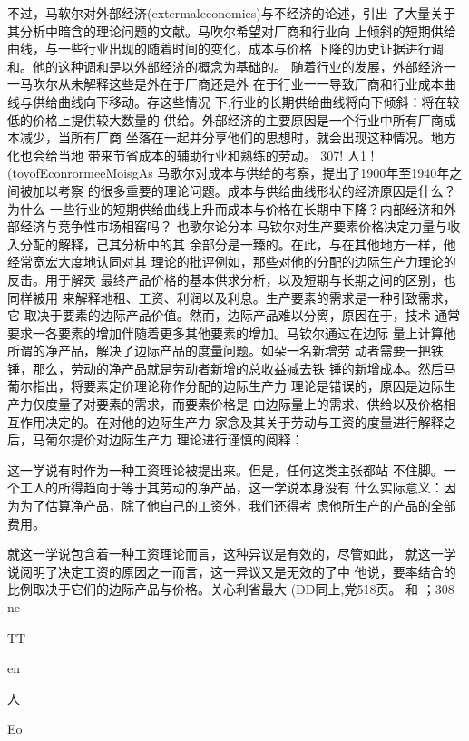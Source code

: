 不过，马软尔对外部经济(extermaleconomies)与不经济的论述，引出
了大量关于其分析中暗含的理论问题的文献。马吹尔希望对厂商和行业向
上倾斜的短期供给曲线，与一些行业出现的随着时间的变化，成本与价格
下降的历史证据进行调和。他的这种调和是以外部经济的概念为基础的。
随着行业的发展，外部经济一一马吹尔从未解释这些是外在于厂商还是外
在于行业一一导致厂商和行业成本曲线与供给曲线向下移动。存这些情况
下,行业的长期供给曲线将向下倾斜：将在较低的价格上提供较大数量的
供给。外部经济的主要原因是一个行业中所有厂商成本减少，当所有厂商
坐落在一起并分享他们的思想时，就会出现这种情况。地方化也会给当地
带来节省成本的辅助行业和熟练的劳动。
307!
人1
!(toyofEconrormeeMoisgAs
马歌尔对成本与供给的考察，提出了1900年至1940年之间被加以考察
的很多重要的理论问题。成本与供给曲线形状的经济原因是什么？为什么
一些行业的短期供给曲线上升而成本与价格在长期中下降？内部经济和外
部经济与竞争性市场相窑吗？
也歌尔论分本
马钦尔对生产要素价格决定力量与收入分配的解释，己其分析中的其
余部分是一臻的。在此，与在其他地方一样，他经常宽宏大度地认同对其
理论的批评例如，那些对他的分配的边际生产力理论的反击。用于解灵
最终产品价格的基本供求分析，以及短期与长期之间的区别，也同样被用
来解释地租、工资、利润以及利息。生产要素的需求是一种引致需求，它
取决于要素的边际产品价值。然而，边际产品难以分离，原因在于，技术
通常要求一各要素的增加伴随着更多其他要素的增加。马钦尔通过在边际
量上计算他所谓的净产品，解决了边际产品的度量问题。如朵一名新增劳
动者需要一把铁锤，那么，劳动的净产品就是劳动者新增的总收益减去铁
锤的新增成本。然后马葡尔指出，将要素定价理论称作分配的边际生产力
理论是错误的，原因是边际生产力仅度量了对要素的需求，而要素价格是
由边际量上的需求、供给以及价格相互作用决定的。在对他的边际生产力
家念及其关于劳动与工资的度量进行解释之后，马葡尔提价对边际生产力
理论进行谨慎的阅释：

这一学说有时作为一种工资理论被提出来。但是，任何这类主张都站
不住脚。一个工人的所得趋向于等于其劳动的净产品，这一学说本身没有
什么实际意义：因为为了估算净产品，除了他自己的工资外，我们还得考
虑他所生产的产品的全部费用。

就这一学说包含着一种工资理论而言，这种异议是有效的，尽管如此，
就这一学说阅明了决定工资的原因之一而言，这一异议又是无效的了中
他说，要率结合的比例取决于它们的边际产品与价格。关心利省最大
(DD同上,党518页。
和
；308
ne

TT

en

人

Eo

